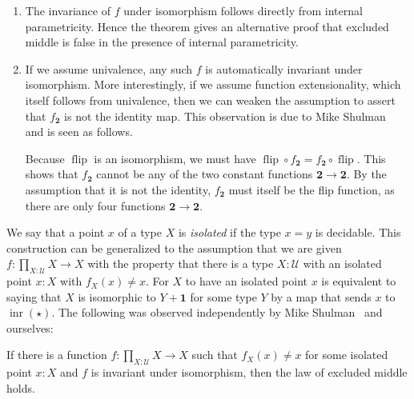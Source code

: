 \documentclass[a4paper,UKenglish]{lipics-v2016}
\newcommand{\comp}{\mathrel{\circ}}
\newcommand{\UU}{\mathcal{U}}
\newcommand{\ttt}{\star}
\newcommand{\unit}{\mathbf{1}}
\newcommand{\bool}{\mathbf{2}}
\newcommand{\inr}{{\operatorname{inr}}}
\newcommand{\flip}{\operatorname{flip}}
\begin{document}
\begin{remark} \leavevmode
  \begin{enumerate}
  \item The invariance of $f$ under isomorphism follows directly from
    internal parametricity. Hence the theorem gives an alternative
    proof that excluded middle is false in the presence of internal
    parametricity.
  \item If we assume univalence, any such $f$ is automatically
    invariant under isomorphism.  More interestingly, if we assume
    function extensionality, which itself follows from univalence,
    then we can weaken the assumption to assert that $f_{\bool}$ is
    not the identity map. This observation is due to Mike
    Shulman~\cite[comment]{parametricity:and:em} and is seen as
    follows.

    Because $\flip$ is an isomorphism, we must have
    $\flip \comp f_\bool = f_\bool \comp \flip$.  This shows that
    $f_\bool$ cannot be any of the two constant functions
    $\bool \to \bool$.  By the assumption that it is not the identity,
    $f_\bool$ must itself be the flip function, as there are only four functions
    $\bool \to \bool$.
  \end{enumerate}
\end{remark}

We say that a point $x$ of a type $X$ is \emph{isolated} if the type
$x=y$ is decidable.  This construction can be generalized to the
assumption that we are given $f:\prod_{X : \UU} X \to X$ with the
property that there is a type $X:\UU$ with an isolated point $x:X$
with $f_X(x) \neq x$.  For $X$ to have an isolated point $x$ is
equivalent to saying that $X$ is isomorphic to $Y+\unit$ for some type
$Y$ by a map that sends $x$ to $\inr(\ttt)$. The following was
observed independently by Mike
Shulman~\cite[comment]{parametricity:and:em} and ourselves:
\begin{theorem}
  If there is a function $f:\prod_{X : \UU} X \to X$ such that
  $f_X(x)\neq x$ for some isolated point $x:X$ and $f$ is invariant
  under isomorphism, then the law of excluded middle holds.
\end{theorem}
\end{document}

